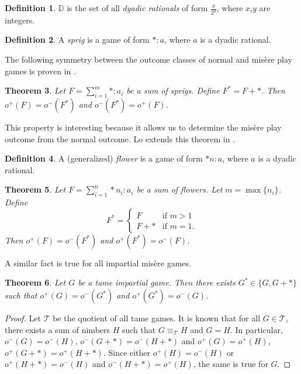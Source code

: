 \documentclass{amsart}
\theoremstyle{plain}
\newtheorem{thm}{Theorem}
\theoremstyle{definition}
\newtheorem{defn}[thm]{Definition}
\theoremstyle{remark}
\numberwithin{equation}{section}
\numberwithin{thm}{section}
\begin{document}
\begin{defn}
$\mathbb{D}$ is the set of all \emph{dyadic rationals} of form $\frac{x}{2^y}$, where $x$,$y$ are integers. \end{defn}

\begin{defn}
A \emph{sprig} is a game of form $*:a$, where $a$ is a dyadic rational.
\end{defn}
The following symmetry between the outcome classes of normal and mis\`ere play games is proven in \cite{mckay2016misere}. 
\begin{thm}
    \label{mckay_thm}
    Let $F = \sum_{i=1}^m *:a_i$ be a sum of sprigs. Define $F^* = F+*$. Then $o^+(F) = o^-(F^*)$ and $o^-(F^*) =o^+(F)$.
\end{thm}
This property is interesting because it allows us to determine the mis\`ere play outcome from the normal outcome. Lo extends this theorem in \cite{lomisere}.
\begin{defn}
    A (generalized) \emph{flower} is a game of form $*n:a$, where $a$ is a dyadic rational.
\end{defn}
\begin{thm}
    \label{lo_thm}
    Let $F = \sum_{i=1}^n *n_i:a_i$ be a sum of flowers. Let $m = \max \{n_i\}$. Define \begin{equation}
        F^* = \begin{cases}
            F & \text{if }m>1 \\
            F+* & \text{if } m = 1.
        \end{cases}
    \end{equation}
    Then $o^+(F) = o^-(F^*)$ and $o^+(F^*) = o^-(F)$.
\end{thm}

A similar fact is true for all impartial mis\`ere games. 

\begin{thm}
    \label{impartial_evil}
    Let $G$ be a tame impartial game. Then there exists $G^* \in \{G,G+*\}$ such that $o^+(G) = o^-(G^*)$ and $o^+(G^*) = o^-(G)$.
\end{thm}

\begin{proof}
Let $\mathscr{T}$ be the quotient of all tame games. It is known that for all $G \in \mathscr{T}$, there exists a sum of nimbers $H$ such that $G \equiv_{\mathscr{T}} H$ and $G = H$. In particular, $o^-(G) = o^-(H)$, $o^-(G+*) = o^-(H+*)$ and $o^+(G) = o^+(H)$, $o^+(G+*) = o^+(H+*)$. Since either $o^+(H) = o^-(H)$ or $o^+(H+*) = o^-(H)$ and $o^-(H+*) = o^+(H)$, the same is true for $G$. 
\end{proof}
\end{document}
